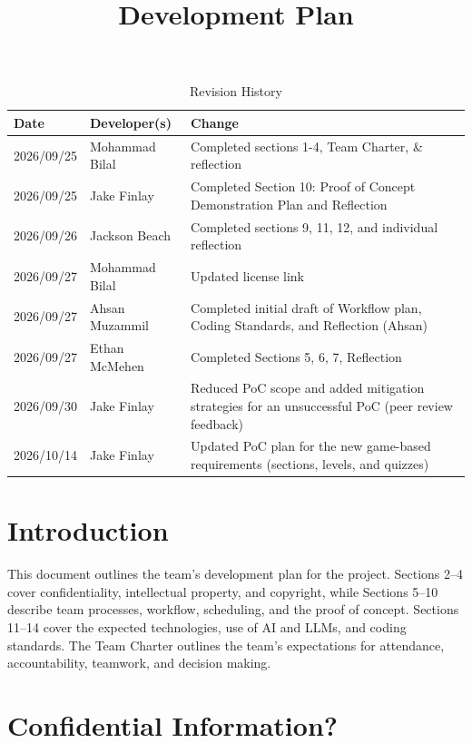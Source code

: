 \documentclass{article}
\title{Development Plan\\\progname}
\author{\authname}
\date{}
\begin{document}
\maketitle

\newpage{}

\begin{table}[hp]
\caption{Revision History} \label{TblRevisionHistory}
\begin{tabularx}{\textwidth}{llX}
\toprule
\textbf{Date} & \textbf{Developer(s)} & \textbf{Change}\\
\midrule
2026/09/25 & Mohammad Bilal & Completed sections 1-4, Team Charter, \& reflection \\
2026/09/25 & Jake Finlay & Completed Section 10: Proof of Concept Demonstration Plan and Reflection \\
2026/09/26 & Jackson Beach & Completed sections 9, 11, 12, and individual reflection \\
2026/09/27 & Mohammad Bilal & Updated license link \\
2026/09/27 & Ahsan Muzammil & Completed initial draft of Workflow plan, Coding Standards, and Reflection (Ahsan)\\
2026/09/27 & Ethan McMehen & Completed Sections 5, 6, 7, Reflection \\
2026/09/30 & Jake Finlay & Reduced PoC scope and added mitigation strategies for an unsuccessful PoC (peer review feedback) \\
2026/10/14 & Jake Finlay & Updated PoC plan for the new game-based requirements (sections, levels, and quizzes) \\
\bottomrule
\end{tabularx}
\end{table}

\newpage{}

\section{Introduction}

This document outlines the team's development plan for the project.
Sections 2--4 cover confidentiality, intellectual property, and copyright,
while Sections 5--10 describe team processes, workflow, scheduling, and the proof of concept.
Sections 11--14 cover the expected technologies, use of AI and LLMs, and coding standards.
The Team Charter outlines the team's expectations for attendance, accountability, teamwork, and decision making.

\section{Confidential Information?}
\end{document}
